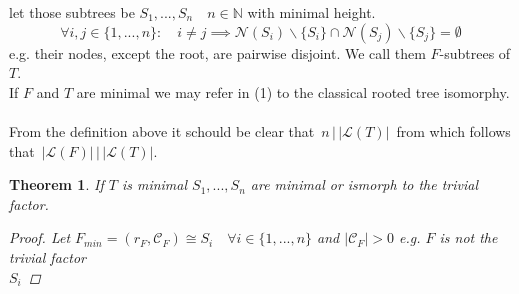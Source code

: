 \documentclass[a4paper,12pt]{article}
\newtheorem{theorem}{Theorem}[section]
\theoremstyle{definition}
\begin{document}
	let those subtrees be $S_1,...,S_n\quad n\in\mathds{N}$ with minimal height.
	\[\forall i,j\in\{1,...,n\}:\quad i\not = j \implies \mathcal{N}(S_i)\backslash \{S_i\}\cap \mathcal{N}(S_j)\backslash \{S_j\}=\emptyset\]
	e.g. their nodes, except the root, are pairwise disjoint. We call them $F$-subtrees of $T$.\\
	If $F$ and $T$ are minimal we may refer in (1) to the classical rooted tree isomorphy.\\\\
	From the definition above it schould be clear that $\,n \,\bigg\vert\, |\mathcal{L}(T)|\, $ from which follows that $\,|\mathcal{L}(F)| \,\bigg\vert\, |\mathcal{L}(T)| $.\\
	\begin{theorem}
		If $T$ is minimal $S_1,...,S_n$ are minimal or ismorph to the trivial factor.
		\begin{proof}
			Let $F_{min}=(r_F, \mathcal{C}_F) \cong S_i\quad \forall i\in\{1,...,n\}$ and $|\mathcal{C}_F| > 0$ e.g. $F$ is not the trivial factor\\
			$S_i$ 
		\end{proof}
	\end{theorem}
\end{document}
